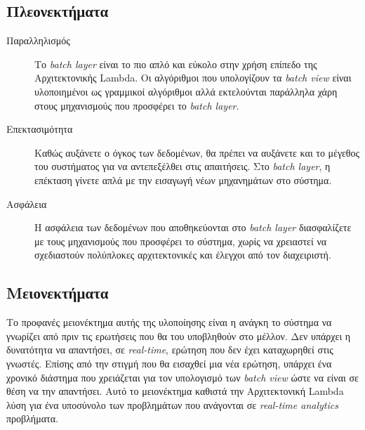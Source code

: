 \subsection{Πλεονεκτήματα}
\begin{description}
\item[Παραλληλισμός] Το \textit{batch layer} είναι το πιο απλό και εύκολο στην χρήση επίπεδο της Αρχιτεκτονικής Lambda. Οι αλγόριθμοι που υπολογίζουν τα \textit{batch view} είναι υλοποιημένοι ως γραμμικοί αλγόριθμοι αλλά εκτελούνται παράλληλα χάρη στους μηχανισμούς που προσφέρει το \textit{batch layer}.
\item[Επεκτασιμότητα] Καθώς αυξάνετε ο όγκος των δεδομένων, θα πρέπει να αυξάνετε και το μέγεθος του συστήματος για να αντεπεξέλθει στις απαιτήσεις. Στο \textit{batch layer}, η επέκταση γίνετε απλά με την εισαγωγή νέων μηχανημάτων στο σύστημα.
\item[Ασφάλεια] Η ασφάλεια των δεδομένων που αποθηκεύονται στο \textit{batch layer} διασφαλίζετε με τους μηχανισμούς που προσφέρει το σύστημα, χωρίς να χρειαστεί να σχεδιαστούν πολύπλοκες αρχιτεκτονικές και έλεγχοι από τον διαχειριστή.
\end{description}


\subsection{Μειονεκτήματα}
Το προφανές μειονέκτημα αυτής της υλοποίησης είναι η ανάγκη το σύστημα να γνωρίζει από πριν τις ερωτήσεις που θα του υποβληθούν στο μέλλον. Δεν υπάρχει η δυνατότητα να απαντήσει, σε \textit{real-time}, ερώτηση που δεν έχει καταχωρηθεί στις γνωστές. Επίσης από την στιγμή που θα εισαχθεί μια νέα ερώτηση, υπάρχει ένα χρονικό διάστημα που χρειάζεται για τον υπολογισμό των \textit{batch view} ώστε να είναι σε θέση να την απαντήσει. Αυτό το μειονέκτημα καθιστά την Αρχιτεκτονική Lambda λύση για ένα υποσύνολο των προβλημάτων που ανάγονται σε \textit{real-time analytics} προβλήματα.